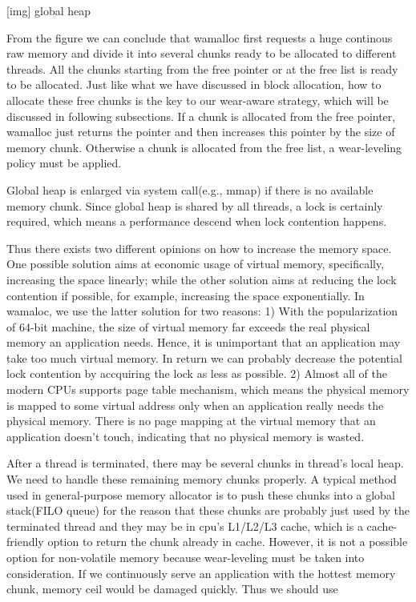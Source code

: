 \documentclass{vldb}
\begin{document}
[img] global heap

From the figure we can conclude that wamalloc first requests a huge continous raw memory and divide it into several chunks ready to be allocated to different threads.
All the chunks starting from the free pointer or at the free list is ready to be allocated.
Just like what we have discussed in block allocation, how to allocate these free chunks is the key to our wear-aware strategy, which will be discussed in following subsections. If a chunk is allocated from the free pointer, wamalloc just returns the pointer and then increases this pointer by the size of memory chunk. Otherwise a chunk is allocated from the free list, a wear-leveling policy must be applied.

Global heap is enlarged via system call(e.g., mmap) if there is no available memory chunk.
Since global heap is shared by all threads, a lock is certainly required, which means a performance descend when lock contention happens.

Thus there exists two different opinions on how to increase the memory space. 
One possible solution aims at economic usage of virtual memory, specifically, increasing the space linearly;
while the other solution aims at reducing the lock contention if possible, for example, increasing the space exponentially. 
In wamaloc, we use the latter solution for two reasons: 
1) With the popularization of 64-bit machine, the size of virtual memory far exceeds the real physical memory an application needs.
Hence, it is unimportant that an application may take too much virtual memory. In return we can probably decrease the potential lock contention by accquiring the lock as less as possible.
2) Almost all of the modern CPUs supports page table mechanism, which means the physical memory is mapped to some virtual address only when an application really needs the physical memory. There is no page mapping at the virtual memory that an application doesn't touch, indicating that no physical memory is wasted.

After a thread is terminated, there may be several chunks in thread's local heap. 
We need to handle these remaining memory chunks properly.
A typical method used in general-purpose memory allocator is to push these chunks into a global stack(FILO queue)
for the reason that these chunks are probably just used by the terminated thread and they may be in cpu's L1/L2/L3 cache, which is a cache-friendly option to return the chunk already in cache.
However, it is not a possible option for non-volatile memory because wear-leveling must be taken into consideration.
If we continuously serve an application with the hottest memory chunk, memory ceil would be damaged quickly.
Thus we should use
\end{document}
